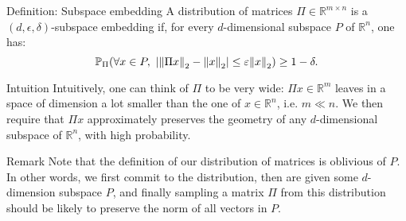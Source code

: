 \documentclass[a4paper]{article}
\begin{document}
\begin{parag}{Definition: Subspace embedding}
    A distribution of matrices $\Pi \in \mathbb{R}^{m \times n}$ is a $\left(d, \epsilon, \delta\right)$-subspace embedding if, for every $d$-dimensional subspace $P$ of $\mathbb{R}^n$, one has: 
    \[\prob_{\Pi}\left(\forall x \in P, \ \left|\left\|\Pi x\right\|_2 - \left\|x\right\|_2\right| \leq \epsilon \left\|x\right\|_2\right) \geq 1 - \delta.\]

    \begin{subparag}{Intuition}
        Intuitively, one can think of $\Pi$ to be very wide: $\Pi x \in \mathbb{R}^m$ leaves in a space of  dimension a lot smaller than the one of $x \in \mathbb{R}^n$, i.e. $m \ll n$. We then require that $\Pi x$ approximately preserves the geometry of any $d$-dimensional subspace of $\mathbb{R}^n$, with high probability.
    \end{subparag}

    \begin{subparag}{Remark}
        Note that the definition of our distribution of matrices is oblivious of $P$. In other words, we first commit to the distribution, then are given some $d$-dimension subspace $P$, and finally sampling a matrix $\Pi$ from this distribution should be likely to preserve the norm of all vectors in $P$.
    \end{subparag}
\end{parag}
\end{document}
